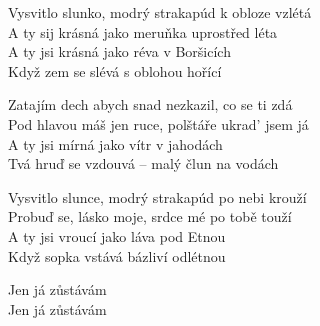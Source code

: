 
\ve{}
Vysvitlo slunko, modrý strakapúd k obloze vzlétá \\
A ty sij krásná jako meruňka uprostřed léta \\
A ty jsi krásná jako réva v Boršicích\\
Když zem se slévá s oblohou hořící 

\ve{}
Zatajím dech abych snad nezkazil, co se ti zdá\\
Pod hlavou máš jen ruce, polštáře ukrad' jsem já\\
A ty jsi mírná jako vítr v jahodách\\
Tvá hruď se vzdouvá -- malý člun na vodách

\ve{}
Vysvitlo slunce, modrý strakapúd po nebi krouží\\
Probuď se, lásko moje, srdce mé po tobě touží\\
A ty jsi vroucí jako láva pod Etnou\\
Když sopka vstává bázliví odlétnou

\re{}
Jen já zůstávám\\
Jen já zůstávám 

\esong{}